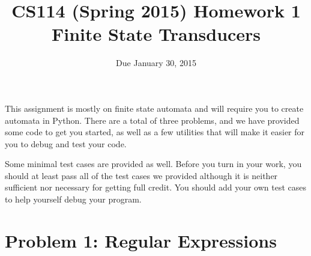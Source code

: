 \documentclass[11pt,letterpaper]{article}
\begin{document}
\title{CS114 (Spring 2015) Homework 1\\Finite State Transducers}
\author{Due January 30, 2015}
\date{}
\maketitle

{}

This assignment is mostly on finite state automata and will require you to
create automata in Python.
There are a total of three problems, and we
have provided some code to get you started, as well as a few utilities
that will make it easier for you to debug and test your code.  

Some minimal test cases are provided as well. 
Before you turn in your work, you should at least pass all of the test cases we provided although it is neither sufficient nor necessary for getting full credit. 
You should add your own test cases to help yourself debug your program.

\section*{Problem 1: Regular Expressions }
\end{document}

